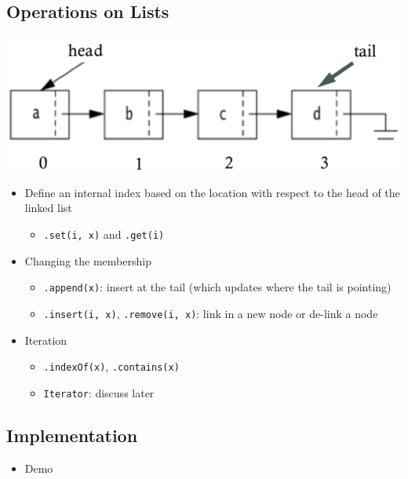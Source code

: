 \documentclass[10pt]{article}
\begin{document}
\subsection*{Operations on Lists}
\begin{center}
\includegraphics[width=\textwidth/4]{images/5.png}
\end{center}
\begin{itemize}
    \item Define an internal index based on the location with respect to the head of the linked list
    \begin{itemize}
        \item \texttt{.set(i, x)} and \texttt{.get(i)}
    \end{itemize}
    \item Changing the membership
    \begin{itemize}
        \item \texttt{.append(x)}: insert at the tail (which updates where the tail is pointing)
        \item \texttt{.insert(i, x)}, \texttt{.remove(i, x)}: link in a new node or de-link a node
    \end{itemize}
    \item Iteration
    \begin{itemize}
        \item \texttt{.indexOf(x)}, \texttt{.contains(x)}
        \item \texttt{Iterator}: discuss later
    \end{itemize}
\end{itemize}

\subsection*{Implementation}
\begin{itemize}
    \item Demo
\end{itemize}
\end{document}
